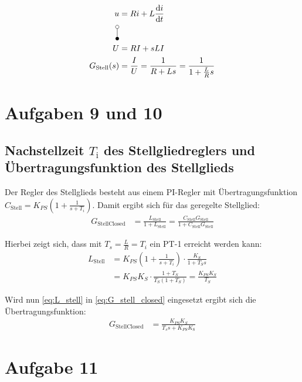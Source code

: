 	\begin{align}\label{eq:G_stell} 
		u &= Ri +L\frac{\mathrm{d}i}{\mathrm{d}t} \nonumber \\
		\laplace \nonumber \\
		U &= RI + sLI \nonumber \\
		G_{\mathrm{Stell}}(s) &= \frac{I}{U} = \frac{1}{R+Ls} = \frac{1}{1+\frac{L}{R}s}
	\end{align}
\newpage
\section{Aufgaben 9 und 10}\label{sec:Aufgabe9_10}
\subsection*{Nachstellzeit $T_{\mathrm{i}}$ des Stellgliedreglers und Übertragungsfunktion des Stellglieds}\label{sub:transfer_Ti_Cstell}

Der Regler des Stellglieds besteht aus einem PI-Regler mit Übertragungsfunktion $C_{\mathrm{Stell}} = K_{PS} \left(1+\frac{1}{s+T_i} \right)$. Damit ergibt sich für das geregelte Stellglied: 
	\begin{align}\label{eq:G_stell_closed} 
		G_{\mathrm{StellClosed}} &= \frac{L_{\mathrm{Stell}}}{1 + L_{\mathrm{Stell}}} = \frac{C_{ \mathrm{Stell}}G_{\mathrm{Stell}} }{1 +  C_{\mathrm{Stell}}G_{\mathrm{Stell}}}	
	\end{align}

	Hierbei zeigt sich, dass mit $T_{s} = \frac{L}{R} = T_{i}$ ein PT-1 erreicht werden kann:
	\begin{align}\label{eq:L_stell} 
		L_{\mathrm{Stell}}  &= K_{PS} \left(1+\frac{1}{s+T_i} \right) \cdot \frac{K_{S}}{1 + T_{S}s} \nonumber \\
							&= K_{PS} K_{S} \cdot \frac{1 + T_{S}}{T_{S}\left( 1 + T_{S} \right)} = \frac{K_{PS} K_{S} }{T_{S}}
	\end{align}

	Wird nun  \autoref{eq:L_stell} in \autoref{eq:G_stell_closed} eingesetzt ergibt sich die Übertragungsfunktion:
	\begin{align}\label{eq:G_stell_closed2} 
		G_{\mathrm{StellClosed}} &= \frac{K_{PS} K_{S}}{T_{s}s + K_{PS} K_{\mathrm{S}}}
	\end{align}



\section{Aufgabe 11}\label{sec:Aufgabe11}
